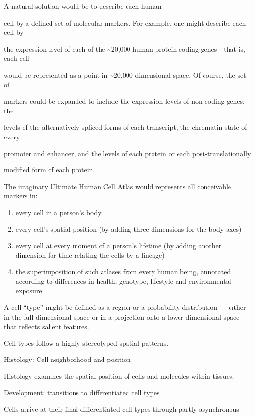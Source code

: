 \documentclass[
]{book}
\begin{document}
A natural solution would be to describe each human

cell by a defined set of molecular markers. For example, one might describe each cell by

the expression level of each of the \textasciitilde20,000 human protein-coding genes---that is, each cell

would be represented as a point in \textasciitilde20,000-dimensional space. Of course, the set of

markers could be expanded to include the expression levels of non-coding genes, the

levels of the alternatively spliced forms of each transcript, the chromatin state of every

promoter and enhancer, and the levels of each protein or each post-translationally

modified form of each protein.

The imaginary Ultimate Human Cell Atlas would represents all conceivable markers in:

\begin{enumerate}
\def\labelenumi{\arabic{enumi}.}
\item
  every cell in a person's body
\item
  every cell's spatial position (by adding three dimensions for the body axes)
\item
  every cell at every moment of a person's lifetime (by adding another dimension for time relating the cells by a lineage)
\item
  the superimposition of such atlases from every human being, annotated according to differences in health, genotype, lifestyle and environmental exposure
\end{enumerate}

A cell ``type'' might be defined as a region or a probability distribution --- either in the full-dimensional space or in a projection onto a lower-dimensional space that reflects salient features.

Cell types follow a highly stereotyped spatial patterns.

Histology: Cell neighborhood and position

Histology examines the spatial position of cells and molecules within tissues.

Development: transitions to differentiated cell types

Cells arrive at their final differentiated cell types through partly asynchronous
\end{document}
